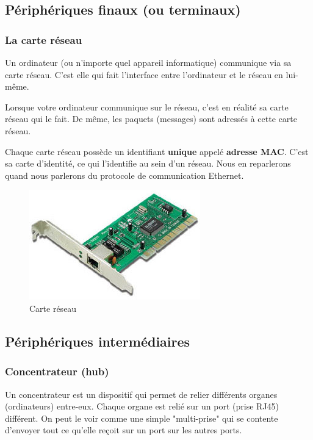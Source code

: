 \subsection{Périphériques finaux (ou terminaux)}
\label{sec:organes}

\subsubsection{La carte réseau}
\label{sec:CarteReseau}
Un ordinateur (ou n'importe quel appareil informatique) communique via sa carte réseau. C'est elle qui fait l'interface entre l'ordinateur et le réseau en lui-même.

Lorsque votre ordinateur communique sur le réseau, c'est en réalité sa carte réseau qui le fait. De même, les paquets (messages) sont adressés à cette carte réseau.

Chaque carte réseau possède un identifiant \textbf{unique} appelé \textbf{adresse MAC}. C'est sa carte d'identité, ce qui l'identifie au sein d'un réseau. Nous en reparlerons quand nous parlerons du protocole de communication Ethernet.

\begin{figure}[h]
\centering
  \includegraphics[width=.4\textwidth]{images/materiel/carteReseau}
  \caption{Carte réseau}
  \label{fig:carteReseau}
\end{figure}

\subsection{Périphériques intermédiaires}
\subsubsection{Concentrateur (hub)}
\label{sec:concentrateur}
Un concentrateur est un dispositif qui permet de relier différents organes (ordinateurs) entre-eux. Chaque organe est relié sur un port (prise RJ45) différent. On peut le voir comme une simple "multi-prise" qui se contente d'envoyer tout ce qu'elle reçoit sur un port sur les autres ports.

